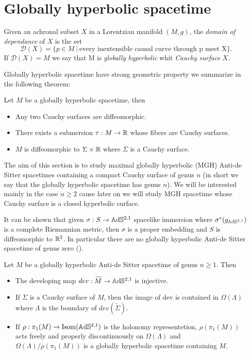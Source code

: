 \section{Globally hyperbolic spacetime}
\begin{definition}
    Given an achronal subset $X$ in a Lorentzian manifold $(M,g)$, the \textit{domain of dependance} of $X$ is the set
    \[
        \mathcal{D}(X)= \{ p \in M \ | \ \text{every inextensible causal curve through p meet X} \}.
    \]
    If $\mathcal{D}(X)=M$ we say that M is  \textit{globally hyperbolic} whit \textit{Cauchy surface} $X$.
\end{definition}
Globally hyperbolic spacetime have strong geometric property we summarize in the following theorem:
\begin{theorem}
    Let $M$ be a globally hyperbolic spacetime, then
    \begin{itemize}
        \item Any two Cauchy surfaces are diffeomorphic.
        \item There  exists a submersion $\tau : M \to \mathbb{R}$ whose fibers are Cauchy surfaces.
        \item $M$ is diffeomorphic to $\Sigma \times \mathbb{R}$ where $\Sigma$ is a Cauchy surface.
    \end{itemize}
\end{theorem}
The aim of this section is to study maximal globally hyperbolic (MGH) Anti-de Sitter spacetimes containing a compact Cauchy surface of genus $n$ (in short we say that the globally hyperbolic spacetime has genus $n$). We will be interested mainly in the case $n\geq 2$ cause later on we will study MGH spacetime whose Cauchy surface is a closed hyperbolic surface.\\ 
\begin{observation}
    It can be shown that given $\sigma :S \to\mathbb{A}\mathrm{d}\mathbb{S}^{2,1}$ spacelike immersion where $\sigma^*(g_{\mathbb{A}\mathrm{d}\mathbb{S}^{2,1}})$ is a complete Riemannian metric, then $\sigma$ is a proper embedding and $S$ is diffeomorphic to $\mathbb{R}^2$.
    In particular there are no globally hyperbolic Anti-de Sitter spacetime of genus zero (\cite{bonsanteseppi}).
\end{observation}
\begin{proposition}\label{prop:GH_geometry}
    Let $M$ be a globally hyperbolic Anti-de Sitter spacetime of genus $n\geq 1$. Then
    \begin{itemize}
        \item The developing map $dev: \widetilde{M} \to\mathbb{A}\mathrm{d}\mathbb{S}^{2,1}$ is injective.
        \item If $\Sigma$ is a Cauchy surface of $M$, then the image of dev is contained in $\Omega(\Lambda)$ where $\Lambda$ is the boundary of $dev(\widetilde{\Sigma})$.
        \item If $\rho : \pi_1(M) \to \text{Isom}(\mathbb{A}\mathrm{d}\mathbb{S}^{2,1})$ is the holonomy representetion, $\rho(\pi_1(M))$ acts freely and properly discontinuously on $\Omega(\Lambda)$ and $\Omega(\Lambda) / \rho(\pi_1(M))$ is a globally hyperbolic spacetime containing $M$.
    \end{itemize}
\end{proposition}
